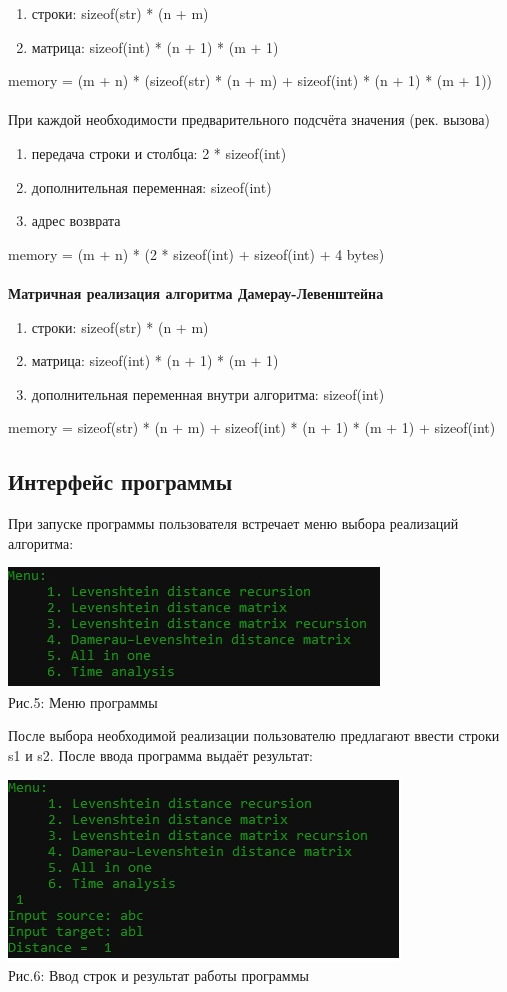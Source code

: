 \documentclass[12pt,a4paper]{article}
\begin{document}
\begin{enumerate}
	\item строки: sizeof(str) * (n + m)
	\item матрица: sizeof(int) * (n + 1) * (m + 1)
\end{enumerate}
memory = (m + n) * (sizeof(str) * (n + m) + sizeof(int) * (n + 1) * (m + 1))
\\\\
При каждой необходимости предварительного подсчёта значения (рек. вызова)
\begin{enumerate}
	\item передача строки и столбца: 2 * sizeof(int)
	\item дополнительная переменная: sizeof(int)
	\item адрес возврата
\end{enumerate}
memory = (m + n) * (2 * sizeof(int) + sizeof(int) + 4 bytes)
\\\\
\textbf{Матричная реализация алгоритма Дамерау-Левенштейна}
\begin{enumerate}
	\item строки: sizeof(str) * (n + m)
	\item матрица: sizeof(int) * (n + 1) * (m + 1)
	\item дополнительная переменная внутри алгоритма: sizeof(int)
\end{enumerate}
memory = sizeof(str) * (n + m) + sizeof(int) * (n + 1) * (m + 1) + sizeof(int)

\subsection{Интерфейс программы}
При запуске программы пользователя встречает меню выбора реализаций алгоритма:\\
\begin{center}
	\includegraphics{menu}\\
	Рис.5: Меню программы
\end{center}
После выбора необходимой реализации пользователю предлагают ввести строки s1 и s2. После ввода программа выдаёт результат:\\
\begin{center}
	\includegraphics{examp}\\
	Рис.6: Ввод строк и результат работы программы
\end{center}
\end{document}
